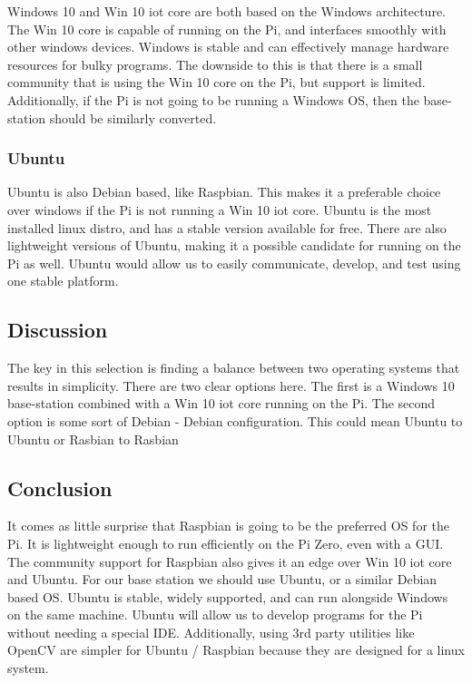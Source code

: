 \documentclass[letterpaper, 10, draftclsnofoot, onecolumn]{IEEEtran}
\begin{document}
Windows 10 and Win 10 iot core\cite{r6} are both based on the Windows 
architecture. The Win 10 core is capable of running on the Pi, and 
interfaces smoothly with other windows devices. Windows is stable 
and can effectively manage hardware resources for bulky programs. 
The downside to this is that there is a small community that is 
using the Win 10 core on the Pi, but support is limited. 
Additionally, if the Pi is not going to be running a Windows OS, 
then the base-station should be similarly converted. 


\subsubsection{Ubuntu}

Ubuntu\cite{r7} is also Debian based, like Raspbian. This makes it a 
preferable choice over windows if the Pi is not running a Win 10 
iot core. Ubuntu is the most installed linux distro, and has a 
stable version available for free. There are also lightweight 
versions of Ubuntu, making it a possible candidate for running on 
the Pi as well. Ubuntu would allow us to easily communicate, 
develop, and test using one stable platform.  


\subsection{Discussion}

The key in this selection is finding a balance between two 
operating systems that results in simplicity. There are two clear 
options here. The first is a Windows 10 base-station combined with 
a Win 10 iot core running on the Pi. The second option is some sort 
of Debian - Debian configuration. This could mean Ubuntu to Ubuntu 
or Rasbian to Rasbian


\subsection{Conclusion}

It comes as little surprise that Raspbian is going to be the 
preferred OS for the Pi. It is lightweight enough to run 
efficiently on the Pi Zero, even with a GUI. The community support 
for Raspbian also gives it an edge over Win 10 iot core and Ubuntu. 
For our base station we should use Ubuntu, or a similar Debian 
based OS. Ubuntu is stable, widely supported, and can run alongside 
Windows on the same machine. Ubuntu will allow us to develop 
programs for the Pi without needing a special IDE. Additionally, 
using 3rd party utilities like OpenCV are simpler for Ubuntu / 
Raspbian because they are designed for a linux system.  
\end{document}
